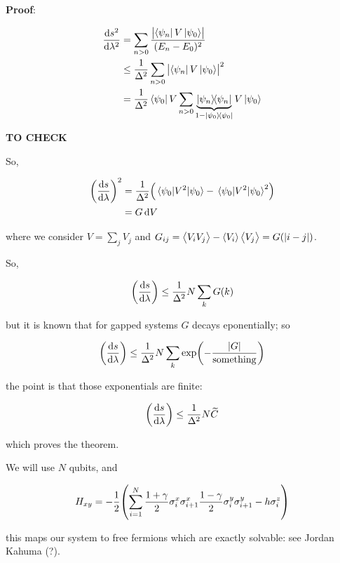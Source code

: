 \documentclass[main_zanardi.tex]{subfiles}
\begin{document}
\begin{greenbox}
  \textbf{Proof}:

  \begin{subequations}
  \begin{align}
    \dv{s^2}{\lambda^2}  &= \sum _{n>0}  \frac{\abs{\bra{\psi_n} V \ket{\psi_0}}}{(E_n - E_0)^2}  \\
    &\leq \frac{1}{\Delta^2} \sum _{n>0} \abs{\bra{\psi_n} V \ket{\psi_0}}^2  \\
    &=  \frac{1}{\Delta^2} \bra{\psi_0} V   \sum _{n>0} \underbrace{\dyad{\psi_n}}_{\substack{1 - \ketbra{\psi_0}{\psi_0}}} V \ket{\psi_0}
  \end{align}
  \end{subequations}

  \textbf{TO CHECK}

  So,

  \begin{subequations}
  \begin{align}
    \qty(\dv{s}{\lambda})^2  &=  \frac{1}{\Delta^2} \qty(\ev{V^2}{\psi_0} - \ev{V^2}{\psi_0}^2)  \\
    &= G \dd{V}
  \end{align}
  \end{subequations}

  where we consider \(V = \sum _{j}  V_j \) and \(G _{ij} = \expval{V_i V_j} - \expval{V_i} \expval{V_j} = G(\abs{i-j} ) \).

  So,

  \begin{equation}
    \qty(\dv{s}{\lambda} ) \leq \frac{1}{\Delta^2} N \sum _{k} G(k)
  \end{equation}

  but it is known that for gapped systems \(G\) decays eponentially; so

  \begin{equation}
    \qty(\dv{s}{\lambda} ) \leq \frac{1}{\Delta^2} N \sum _{k} \exp(-\frac{\abs{G}}{\text{something}}  )
  \end{equation}

  the point is that those exponentials are finite:

  \begin{equation}
    \qty(\dv{s}{\lambda} ) \leq \frac{1}{\Delta^2} N \widetilde{C}
  \end{equation}

  which proves the theorem.
\end{greenbox}

We will use \(N\) qubits, and

\begin{equation}
  H_{xy} = -\frac{1}{2} \qty(\sum _{i=1}   ^{N} \frac{1 + \gamma}{2} \sigma_i ^x \sigma_{i+1}^x \frac{1-\gamma}{2} \sigma^y_i \sigma_{i+1}^y - h \sigma_i^{z} )
\end{equation}

this maps our system to free fermions which are exactly solvable: see Jordan Kahuma (?).
\end{document}

